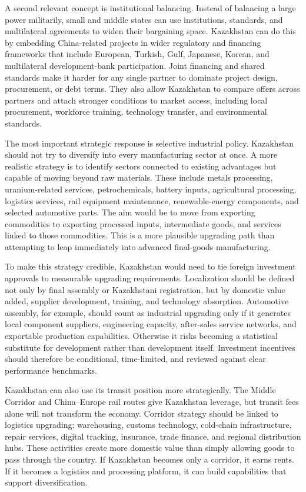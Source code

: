 \documentclass[12pt]{article}
\begin{document}
A second relevant concept is institutional balancing. Instead of balancing a large power militarily, small and middle states can use institutions, standards, and multilateral agreements to widen their bargaining space. Kazakhstan can do this by embedding China-related projects in wider regulatory and financing frameworks that include European, Turkish, Gulf, Japanese, Korean, and multilateral development-bank participation. Joint financing and shared standards make it harder for any single partner to dominate project design, procurement, or debt terms. They also allow Kazakhstan to compare offers across partners and attach stronger conditions to market access, including local procurement, workforce training, technology transfer, and environmental standards.

The most important strategic response is selective industrial policy. Kazakhstan should not try to diversify into every manufacturing sector at once. A more realistic strategy is to identify sectors connected to existing advantages but capable of moving beyond raw materials. These include metals processing, uranium-related services, petrochemicals, battery inputs, agricultural processing, logistics services, rail equipment maintenance, renewable-energy components, and selected automotive parts. The aim would be to move from exporting commodities to exporting processed inputs, intermediate goods, and services linked to those commodities. This is a more plausible upgrading path than attempting to leap immediately into advanced final-goods manufacturing.

To make this strategy credible, Kazakhstan would need to tie foreign investment approvals to measurable upgrading requirements. Localization should be defined not only by final assembly or Kazakhstani registration, but by domestic value added, supplier development, training, and technology absorption. Automotive assembly, for example, should count as industrial upgrading only if it generates local component suppliers, engineering capacity, after-sales service networks, and exportable production capabilities. Otherwise it risks becoming a statistical substitute for development rather than development itself. Investment incentives should therefore be conditional, time-limited, and reviewed against clear performance benchmarks.

Kazakhstan can also use its transit position more strategically. The Middle Corridor and China--Europe rail routes give Kazakhstan leverage, but transit fees alone will not transform the economy. Corridor strategy should be linked to logistics upgrading: warehousing, customs technology, cold-chain infrastructure, repair services, digital tracking, insurance, trade finance, and regional distribution hubs. These activities create more domestic value than simply allowing goods to pass through the country. If Kazakhstan becomes only a corridor, it earns rents. If it becomes a logistics and processing platform, it can build capabilities that support diversification.
\end{document}
